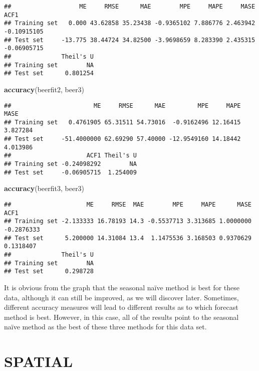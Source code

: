 \documentclass[
]{article}
\newenvironment{Shaded}{\begin{snugshade}}{\end{snugshade}}
\newcommand{\KeywordTok}[1]{\textcolor[rgb]{0.13,0.29,0.53}{\textbf{#1}}}
\newcommand{\NormalTok}[1]{#1}
\begin{document}
\begin{verbatim}
##                   ME     RMSE      MAE        MPE     MAPE     MASE        ACF1
## Training set   0.000 43.62858 35.23438 -0.9365102 7.886776 2.463942 -0.10915105
## Test set     -13.775 38.44724 34.82500 -3.9698659 8.283390 2.435315 -0.06905715
##              Theil's U
## Training set        NA
## Test set      0.801254
\end{verbatim}

\begin{Shaded}
\begin{Highlighting}[]
\KeywordTok{accuracy}\NormalTok{(beerfit2, beer3)}
\end{Highlighting}
\end{Shaded}

\begin{verbatim}
##                       ME     RMSE      MAE         MPE     MAPE     MASE
## Training set   0.4761905 65.31511 54.73016  -0.9162496 12.16415 3.827284
## Test set     -51.4000000 62.69290 57.40000 -12.9549160 14.18442 4.013986
##                     ACF1 Theil's U
## Training set -0.24098292        NA
## Test set     -0.06905715  1.254009
\end{verbatim}

\begin{Shaded}
\begin{Highlighting}[]
\KeywordTok{accuracy}\NormalTok{(beerfit3, beer3)}
\end{Highlighting}
\end{Shaded}

\begin{verbatim}
##                     ME     RMSE  MAE        MPE     MAPE      MASE       ACF1
## Training set -2.133333 16.78193 14.3 -0.5537713 3.313685 1.0000000 -0.2876333
## Test set      5.200000 14.31084 13.4  1.1475536 3.168503 0.9370629  0.1318407
##              Theil's U
## Training set        NA
## Test set      0.298728
\end{verbatim}

It is obvious from the graph that the seasonal naïve method is best for
these data, although it can still be improved, as we will discover
later. Sometimes, different accuracy measures will lead to different
results as to which forecast method is best. However, in this case, all
of the results point to the seasonal naïve method as the best of these
three methods for this data set.

\hypertarget{spatial}{%
\section{\texorpdfstring{\textbf{SPATIAL}}{SPATIAL}}\label{spatial}}
\end{document}

